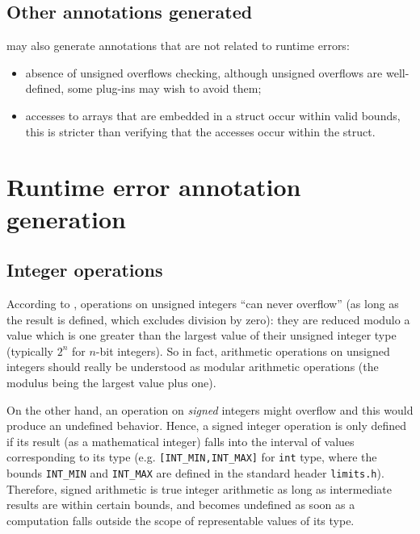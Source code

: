 \section{Other annotations generated}

\rte{} may also generate annotations that are not related to runtime errors:
\begin{itemize}
\item absence of unsigned overflows checking, although unsigned overflows are
  well-defined, some plug-ins may wish to avoid them;
\item accesses to arrays that are embedded in a struct occur within valid
  bounds, this is stricter than verifying that the accesses occur within the
  struct.
\end{itemize}

\chapter{Runtime error annotation generation}

\section{Integer operations}

According to , operations on unsigned integers ``can never
overflow'' (as long as the result is defined, which excludes division by zero):
they are reduced modulo a value which is one greater than the largest value of
their unsigned integer type (typically $2^n$ for $n$-bit integers).  So in fact,
arithmetic operations on unsigned integers should really be understood as
modular arithmetic operations (the modulus being the largest value plus one).

On the other hand, an operation on {\em signed} integers might overflow and this
would produce an undefined behavior.  Hence, a signed integer operation is only
defined if its result (as a mathematical integer) falls into the interval of
values corresponding to its type (e.g. \lstinline|[INT_MIN,INT_MAX]| for
\lstinline|int| type, where the bounds \lstinline|INT_MIN| and
\lstinline|INT_MAX| are defined in the standard header \lstinline|limits.h|).
Therefore, signed arithmetic is true integer arithmetic as long as intermediate
results are within certain bounds, and becomes undefined as soon as a
computation falls outside the scope of representable values of its type.

